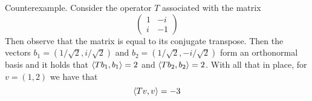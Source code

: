 \documentclass[10pt, twocolumn]{article}
\begin{document}
\begin{q}[1]
    Counterexample.
    Consider the operator $ T $ associated with the matrix  
    $$ \left(\begin{array}{cc}
        1 & -i \\
        i & -1 
    \end{array} \right) 
    $$
    Then observe that the matrix is equal to its conjugate transpose. 
    Then the vectors $ b_1 = (1/\sqrt{2}, i/\sqrt{2}) $ and $ b_2 = (1/\sqrt{2}, -i/\sqrt{2}) $ 
    form an orthonormal basis and it holds that 
    $ \langle Tb_1, b_1\rangle = 2 $ and $ \langle Tb_2, b_2\rangle = 2 $.
    With all that in place, for $ v = (1, 2) $ we have that 
    $$ \langle Tv, v\rangle = -3 $$
\end{q}

\begin{q}[2]
    
\end{q}
\end{document}
